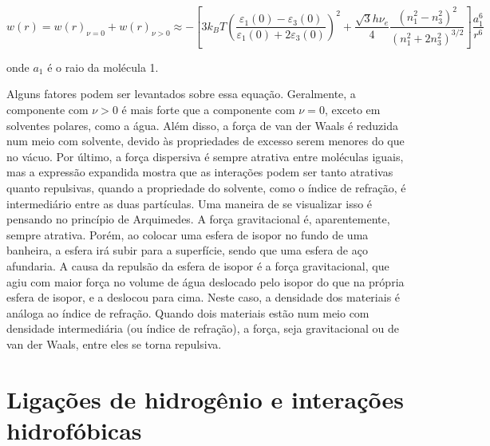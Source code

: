 	\begin{equation}
		w ( r ) = w ( r ) _ { \nu = 0 } + w ( r ) _ { \nu > 0 } \approx - \left[ 3 k_B T \left( \frac { \varepsilon _ { 1 } ( 0 ) - \varepsilon _ { 3 } ( 0 ) } { \varepsilon _ { 1 } ( 0 ) + 2 \varepsilon _ { 3 } ( 0 ) } \right) ^ { 2 } + \frac { \sqrt { 3 } h \nu _ { e } } { 4 } \frac { \left( n _ { 1 } ^ { 2 } - n _ { 3 } ^ { 2 } \right) ^ { 2 } } { \left( n _ { 1 } ^ { 2 } + 2 n _ { 3 } ^ { 2 } \right) ^ { 3 / 2 } } \right] \frac { a _ { 1 } ^ { 6 } } { r ^ { 6 } }
		\label{eqn:energia_maclachlan}
	\end{equation} 
	
	\noindent onde \(a_1\) é o raio da molécula 1.
	
	Alguns fatores podem ser levantados sobre essa equação. Geralmente, a componente com \(\nu > 0\) é mais forte que a componente com \(\nu = 0\), exceto em solventes polares, como a água. Além disso, a força de van der Waals é reduzida num meio com solvente, devido às propriedades de excesso serem menores do que no vácuo. Por último, a força dispersiva é sempre atrativa entre moléculas iguais\cite{Hamaker1937}, mas a expressão expandida mostra que as interações podem ser tanto atrativas quanto repulsivas, quando a propriedade do solvente, como o índice de refração, é intermediário entre as duas partículas. Uma maneira de se visualizar isso é pensando no princípio de Arquimedes. A força gravitacional é, aparentemente, sempre atrativa. Porém, ao colocar uma esfera de isopor no fundo de uma banheira, a esfera irá subir para a superfície, sendo que uma esfera de aço afundaria. A causa da repulsão da esfera de isopor é a força gravitacional, que agiu com maior força no volume de água deslocado pelo isopor do que na própria esfera de isopor, e a deslocou para cima. Neste caso, a densidade dos materiais é análoga ao índice de refração. Quando dois materiais estão num meio com densidade intermediária (ou índice de refração), a força, seja gravitacional ou de van der Waals, entre eles se torna repulsiva.
	
	\section{Ligações de hidrogênio e interações hidrofóbicas}   \label{sec:ligacoes_hidrogenio}
	
